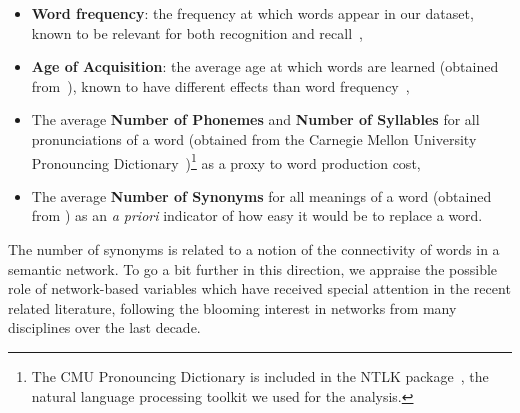 \begin{itemize}
    \item \textbf{Word frequency}: the frequency at which words appear in our dataset, known to be relevant for both recognition and recall~\citep{gregg1976word},
    \item \textbf{Age of Acquisition}: the average age at which words are learned (obtained from~\citet{Kuperman12}), known to have different effects than word frequency~\citep{morrison1995roles,dewhurst1998separate},
    \item The average \textbf{Number of Phonemes} and \textbf{Number of Syllables} for all pronunciations of a word (obtained from the Carnegie Mellon University Pronouncing Dictionary~\citep{Weide98})\footnote{The CMU Pronouncing Dictionary is included in the NTLK package~\citep{Bird09}, the natural language processing toolkit we used for the analysis.} as a proxy to word production cost,
    \item The average \textbf{Number of Synonyms} for all meanings of a word (obtained from \citet{WordNet10}) as an \emph{a priori} indicator of how easy it would be to replace a word.
\end{itemize}


The number of synonyms is related to a notion of the connectivity of words in a semantic network.  To go a bit further in this direction, we appraise the possible role of network-based variables which have received special attention in the recent related literature, following the blooming interest in networks from many disciplines over the last decade. 

